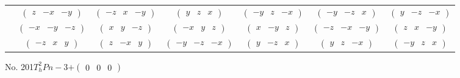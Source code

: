 \documentclass[fleqn,9pt,landscape]{jsarticle}
\begin{document}
\begin{center}
\begin{longtable}{ccccccc}
& $ \begin{pmatrix} z & - x & - y \end{pmatrix} $ & $ \begin{pmatrix} - z & x & - y \end{pmatrix} $ & $ \begin{pmatrix} y & z & x \end{pmatrix} $ & $ \begin{pmatrix} - y & z & - x \end{pmatrix} $ & $ \begin{pmatrix} - y & - z & x \end{pmatrix} $ & $ \begin{pmatrix} y & - z & - x \end{pmatrix} $ \\
& $ \begin{pmatrix} - x & - y & - z \end{pmatrix} $ & $ \begin{pmatrix} x & y & - z \end{pmatrix} $ & $ \begin{pmatrix} - x & y & z \end{pmatrix} $ & $ \begin{pmatrix} x & - y & z \end{pmatrix} $ & $ \begin{pmatrix} - z & - x & - y \end{pmatrix} $ & $ \begin{pmatrix} z & x & - y \end{pmatrix} $ \\
& $ \begin{pmatrix} - z & x & y \end{pmatrix} $ & $ \begin{pmatrix} z & - x & y \end{pmatrix} $ & $ \begin{pmatrix} - y & - z & - x \end{pmatrix} $ & $ \begin{pmatrix} y & - z & x \end{pmatrix} $ & $ \begin{pmatrix} y & z & - x \end{pmatrix} $ & $ \begin{pmatrix} - y & z & x \end{pmatrix} $ \\
\end{longtable}
\end{center}
\newpage
No. 201\quad$T_{h}^{2}$\quad$Pn-3$\quad[ cubic ]\quad$+\begin{pmatrix} 0 & 0 & 0 \end{pmatrix}$
\end{document}
